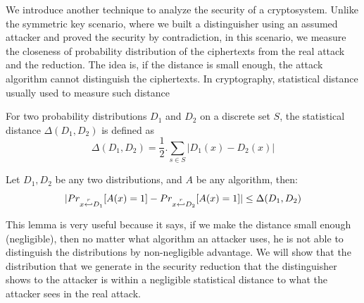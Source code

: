 \begin{description}
\begin{description}
\begin{definition}
                        \label{def:PublicKeyIndCPARegev}
                    \end{definition}

                    We introduce another technique to analyze the security of a
                    cryptosystem. Unlike the symmetric key scenario, where we
                    built a distinguisher using an assumed attacker and proved
                    the security by contradiction, in this scenario, we measure the
                    closeness of probability distribution of the ciphertexts
                    from the real attack and the reduction. The idea is, if the
                    distance is small enough, the attack algorithm
                    cannot distinguish the ciphertexts. In cryptography,
                    statistical distance usually used to measure such
                    distance
                    \begin{definition}
                         For two probability
                        distributions $D_1$ and $D_2$ on a discrete set
                        $S$, the statistical distance $\Delta(D_1,D_2)$ is
                        defined as
                        \[
                            \Delta(D_1, D_2) = \frac{1}{2}. \sum_{s \in
                            S}|D_1(x) - D_2(x)|
                        \]
                        \label{def:statisticalDistance}
                    \end{definition}
                    \begin{lemma}
                        Let $D_1, D_2$ be any two distributions, and $A$ be any
                        algorithm, then:
                        \[
                            |Pr_{x\stackrel{r}{\hookleftarrow} D_1}[A(x) = 1] -
                            Pr_{x\stackrel{r}{\hookleftarrow} D_2}[A(x) = 1]| \leq \Delta(D_1,
                            D_2)
                        \]
                        \label{lem:statisticalDistance}
                    \end{lemma}
                    This lemma is very useful because it says,
                    if we make the distance
                    small enough (negligible), then no matter what algorithm an attacker
                    uses, he is not able to distinguish the distributions by
                    non-negligible advantage. We will show that the distribution
                    that we generate in the security reduction that the
                    distinguisher shows to the attacker is within a negligible
                    statistical distance to what the attacker sees in the real
                    attack.


\end{description}
\end{description}
